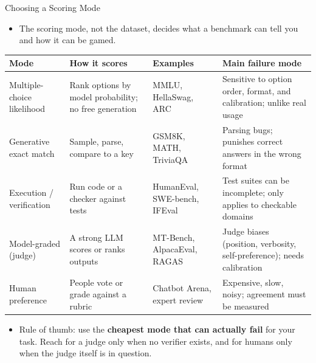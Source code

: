 \begin{frame}{Choosing a Scoring Mode}
  \begin{itemize}\footnotesize
    \item[\textcolor{red}{$\blacktriangleright$}] The scoring mode, not the dataset, decides what a benchmark can tell you and how it can be gamed.
  \end{itemize}
  \vspace{0.3em}
  {\centering\scriptsize
  \begin{tabular}{p{2.25cm} p{3.0cm} p{2.75cm} p{3.35cm}}
    \toprule
    \textbf{Mode} & \textbf{How it scores} & \textbf{Examples} & \textbf{Main failure mode} \\
    \midrule
    Multiple-choice likelihood & Rank options by model probability; no free generation & MMLU, HellaSwag, ARC & Sensitive to option order, format, and calibration; unlike real usage \\
    \addlinespace[0.2em]
    Generative exact match & Sample, parse, compare to a key & GSM8K, MATH, TriviaQA & Parsing bugs; punishes correct answers in the wrong format \\
    \addlinespace[0.2em]
    Execution / verification & Run code or a checker against tests & HumanEval, SWE-bench, IFEval & Test suites can be incomplete; only applies to checkable domains \\
    \addlinespace[0.2em]
    Model-graded (judge) & A strong LLM scores or ranks outputs & MT-Bench, AlpacaEval, RAGAS & Judge biases (position, verbosity, self-preference); needs calibration \\
    \addlinespace[0.2em]
    Human preference & People vote or grade against a rubric & Chatbot Arena, expert review & Expensive, slow, noisy; agreement must be measured \\
    \bottomrule
  \end{tabular}\par}
  \vspace{0.5em}
  \begin{itemize}\footnotesize
    \item[\textcolor{red}{$\blacktriangleright$}] Rule of thumb: use the \textbf{cheapest mode that can actually fail} for your task. Reach for a judge only when no verifier exists, and for humans only when the judge itself is in question.
  \end{itemize}
\end{frame}
